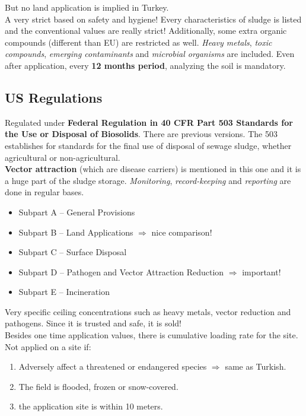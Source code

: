 \documentclass{article}
\numberwithin{equation}{section}
\begin{document}
\begin{enumerate}
    But no land application is implied in Turkey.\\
    A very strict based on safety and hygiene! Every characteristics of sludge is listed and the conventional values are really strict! Additionally, some extra organic compounds (different than EU) are restricted as well. \emph{Heavy metals}, \emph{toxic compounds}, \emph{emerging contaminants} and \emph{microbial organisms} are included. Even after application, every \textbf{12 months period}, analyzing the soil is mandatory.
\end{enumerate}
\subsection{US Regulations}\label{regulation:us}
Regulated under \textbf{Federal Regulation in 40 CFR Part 503 Standards for the Use or Disposal of Biosolids}. There are previous versions. The 503 establishes for standards for the final use of disposal of sewage sludge, whether agricultural or non-agricultural.\\
\textbf{Vector attraction} (which are disease carriers) is mentioned in this one and it is a huge part of the sludge storage. \emph{Monitoring}, \emph{record-keeping} and \emph{reporting} are done in regular bases.
\begin{itemize}
    \item Subpart A -- General Provisions
    \item Subpart B -- Land Applications $\Rightarrow$ nice comparison!
    \item Subpart C -- Surface Disposal
    \item Subpart D -- Pathogen and Vector Attraction Reduction $\Rightarrow$ important!
    \item Subpart E -- Incineration
\end{itemize}
Very specific ceiling concentrations such as heavy metals, vector reduction and pathogens. Since it is trusted and safe, it is sold!\\
Besides one time application values, there is cumulative loading rate for the site.
Not applied on a site if:
\begin{enumerate}
    \item Adversely affect a threatened or endangered species $\Rightarrow$ same as Turkish.
    \item The field is flooded, frozen or snow-covered.
    \item the application site is within 10 meters.
\end{enumerate}
\end{document}
